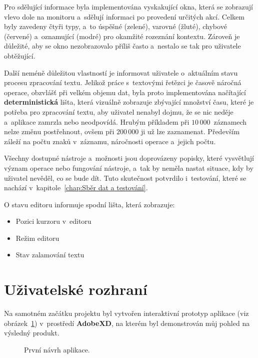 Pro sdělující informace byla implementována vyskakující okna, která se zobrazují vlevo dole na monitoru a~sdělují informaci po provedení určitých akcí. Celkem byly zavedeny čtyři typy, a~to úspěšné (zelené), varovné (žluté), chybové (červené) a~oznamující (modré) pro okamžité rozeznání kontextu. Zároveň je důležité, aby se okno nezobrazovalo příliš často a~nestalo se tak pro uživatele obtěžující.

Další neméně důležitou vlastností je informovat uživatele o~aktuálním stavu procesu zpracování textu. Jelikož práce s~textovými řetězci je časově náročná operace, obzvlášť při velkém objemu dat, byla proto implementována načítající \textbf{deterministická} lišta, která vizuálně zobrazuje zbývající množství času, které je potřeba pro zpracování textu, aby uživatel nenabyl dojmu, že se nic neděje a~aplikace zamrzla nebo neodpovídá. Hrubým příkladem při $10\,000$~záznamech nelze změnu postřehnout, ovšem při $200\,000$ ji už lze zaznamenat. Především záleží na počtu znaků v~záznamu, náročnosti operace a~jejich počtu.

Všechny dostupné nástroje a~možnosti jsou doprovázeny popisky, které vysvětlují význam operace nebo fungování nástroje, a~tak by neměla nastat situace, kdy by uživatel nevěděl, co se bude dít. Tuto skutečnost potvrdilo i~testování, které se nachází v~kapitole~\ref{chap:Sběr dat a testování}.

O stavu editoru informuje spodní lišta, která zobrazuje:
\begin{itemize}
    \item Pozici kurzoru v~editoru
    \item Režim editoru
    \item Stav zalamování textu
\end{itemize}

\section{Uživatelské rozhraní}
\label{sec:Uživatelské rozhraní}
Na samotném začátku projektu byl vytvořen interaktivní prototyp aplikace (viz obrázek~\ref{obr:První návrh}) v~prostředí \textbf{AdobeXD}, na kterém byl demonstrován můj pohled na výsledný produkt.
\begin{figure}[hbt]
	\centering
	\setlength{\fboxsep}{0pt}
	\caption{První návrh aplikace.}
	\label{obr:První návrh}
\end{figure}

